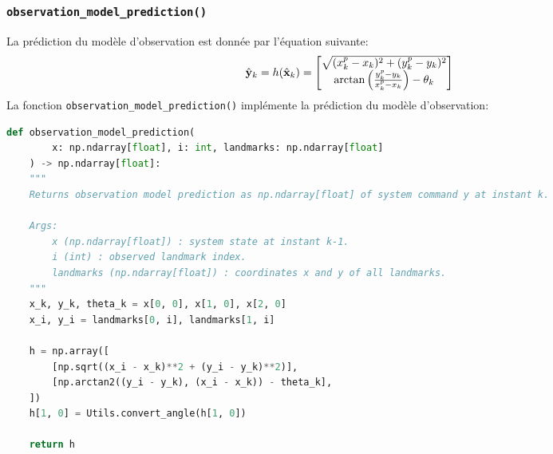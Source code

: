 \documentclass[../CSC_5RO12_TA_TP2.tex]{subfiles}
\begin{document}
\subsubsection{\texttt{observation\_model\_prediction()}}
\begin{definition}
    La prédiction du modèle d'observation est donnée par l'équation suivante:
    \begin{equation}
        \hat{\bf{y}}_{k} = h(\hat{\bf{x}}_{k}) = \begin{bmatrix}
            \sqrt{(x^{p}_{k} - x_{k})^{2} + (y^{p}_{k} - y_{k})^{2}}\\
            \arctan{\left(\frac{y^{p}_{k} - y_{k}}{x^{p}_{k} - x_{k}}\right)} - \theta_{k}
        \end{bmatrix}
    \end{equation}
    La fonction \texttt{observation\_model\_prediction()} implémente la prédiction du modèle d'observation:
    \begin{scriptsize}\mycode
        \begin{lstlisting}[language=Python, caption=\texttt{observation\_model\_prediction()}]
def observation_model_prediction(
        x: np.ndarray[float], i: int, landmarks: np.ndarray[float]
    ) -> np.ndarray[float]:
    """
    Returns observation model prediction as np.ndarray[float] of system command y at instant k.

    Args:
        x (np.ndarray[float]) : system state at instant k-1.
        i (int) : observed landmark index.
        landmarks (np.ndarray[float]) : coordinates x and y of all landmarks.
    """
    x_k, y_k, theta_k = x[0, 0], x[1, 0], x[2, 0]
    x_i, y_i = landmarks[0, i], landmarks[1, i]

    h = np.array([
        [np.sqrt((x_i - x_k)**2 + (y_i - y_k)**2)],
        [np.arctan2((y_i - y_k), (x_i - x_k)) - theta_k],
    ])
    h[1, 0] = Utils.convert_angle(h[1, 0])

    return h
        \end{lstlisting}
    \end{scriptsize}
\end{definition}
\end{document}

